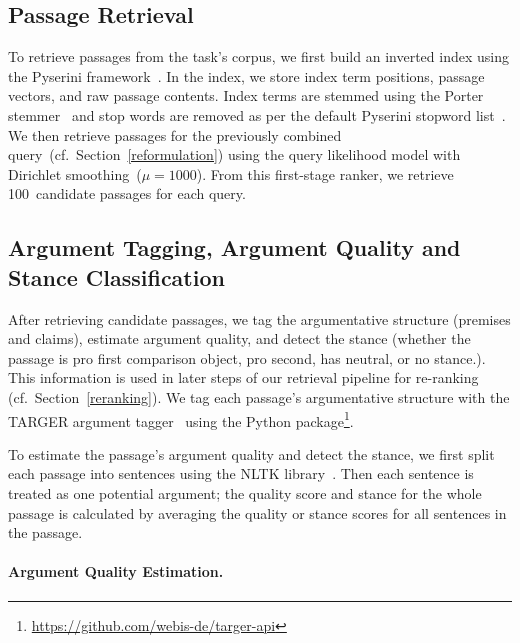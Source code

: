 \subsection{Passage Retrieval}\label{retrieval}

To retrieve passages from the task's corpus, we first build an inverted index using the Pyserini framework~\cite{LinMLYPN2021}.
In the index, we store index term positions, passage vectors, and raw passage contents.
Index terms are stemmed using the Porter stemmer~\cite{Porter1980} and stop words are removed as per the default Pyserini stopword list~\cite{LinMLYPN2021}.
We then retrieve passages for the previously combined query~(cf.\ Section~\ref{reformulation}) using the query likelihood model with Dirichlet smoothing~(\( \mu = 1000 \)).
From this first-stage ranker, we retrieve 100~candidate passages for each query.

\subsection{Argument Tagging, Argument Quality and Stance Classification}
\label{argument-tagging}

After retrieving candidate passages, we tag the argumentative structure (premises and claims), estimate argument quality, and detect the stance (whether the passage is pro first comparison object, pro second, has neutral, or no stance.).
This information is used in later steps of our retrieval pipeline for re-ranking (cf.\ Section~\ref{reranking}).
We tag each passage's argumentative structure with the TARGER argument tagger~\cite{ChernodubOHBHBP2019} using the  Python package\footnote{\url{https://github.com/webis-de/targer-api}}.

To estimate the passage's argument quality and detect the stance, we first split each passage into sentences using the NLTK library~\cite{BirdLK2009}.
Then each sentence is treated as one potential argument; the quality score and stance for the whole passage is calculated by averaging the quality or stance scores for all sentences in the passage.

\paragraph{Argument Quality Estimation.}


